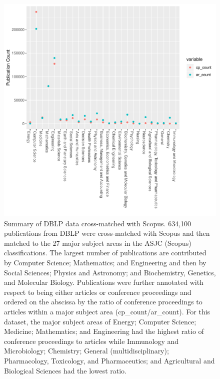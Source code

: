  \begin{figure}[ht]
\centering
  \includegraphics[scale=0.5]{ar_cp_ratio.pdf}
\caption{Summary of DBLP data cross-matched with Scopus. 634,100 publications from DBLP were cross-matched with Scopus and then matched to the 27 major subject areas in the ASJC (Scopus) classifications. The largest number of publications are contributed by Computer Science; Mathematics; and Engineering and then by Social Sciences; Physics and Astronomy; and Biochemistry, Genetics, and Molecular Biology. Publications were further annotated with respect to being either articles or conference proceedings and ordered on the abscissa by the ratio of conference proceedings to articles within a major subject area (cp\_count/ar\_count). For this dataset, the major subject areas of Energy; Computer Science; Medicine; Mathematics; and Engineering had the highest ratio of conference proceedings to articles while Immunology and Microbiology; Chemistry; General (multidisciplinary); Pharmacology, Toxicology, and Pharmaceutics; and Agricultural and Biological Sciences had the lowest ratio. }
\label{ar_cp_annotation}       %
\end{figure}

